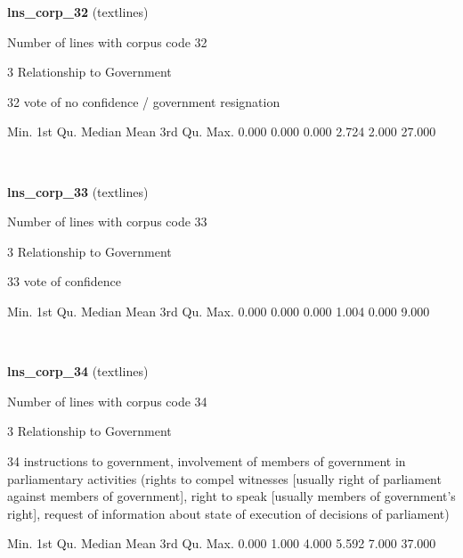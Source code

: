 \documentclass[]{article}
\newenvironment{Shaded}{\begin{snugshade}}{\end{snugshade}}
\newcommand{\FloatTok}[1]{\textcolor[rgb]{0.00,0.00,0.81}{{#1}}}
\newcommand{\NormalTok}[1]{{#1}}
\begin{document}
\textbf{lns\_corp\_32} (textlines)

Number of lines with corpus code 32

3 Relationship to Government

32 vote of no confidence / government resignation

\begin{Shaded}
\begin{Highlighting}[]
   \NormalTok{Min. 1st Qu.  Median    Mean 3rd Qu.    Max. }
  \FloatTok{0.000}   \FloatTok{0.000}   \FloatTok{0.000}   \FloatTok{2.724}   \FloatTok{2.000}  \FloatTok{27.000} 
\end{Highlighting}
\end{Shaded}

~

\vspace{1em}

\textbf{lns\_corp\_33} (textlines)

Number of lines with corpus code 33

3 Relationship to Government

33 vote of confidence

\begin{Shaded}
\begin{Highlighting}[]
   \NormalTok{Min. 1st Qu.  Median    Mean 3rd Qu.    Max. }
  \FloatTok{0.000}   \FloatTok{0.000}   \FloatTok{0.000}   \FloatTok{1.004}   \FloatTok{0.000}   \FloatTok{9.000} 
\end{Highlighting}
\end{Shaded}

~

\vspace{1em}

\textbf{lns\_corp\_34} (textlines)

Number of lines with corpus code 34

3 Relationship to Government

34 instructions to government, involvement of members of government in
parliamentary activities (rights to compel witnesses {[}usually right of
parliament against members of government{]}, right to speak {[}usually
members of government's right{]}, request of information about state of
execution of decisions of parliament)

\begin{Shaded}
\begin{Highlighting}[]
   \NormalTok{Min. 1st Qu.  Median    Mean 3rd Qu.    Max. }
  \FloatTok{0.000}   \FloatTok{1.000}   \FloatTok{4.000}   \FloatTok{5.592}   \FloatTok{7.000}  \FloatTok{37.000} 
\end{Highlighting}
\end{Shaded}
\end{document}
